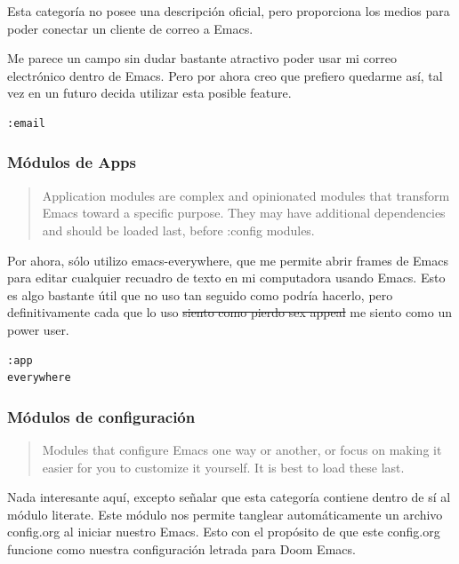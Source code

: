 \documentclass[11pt]{article}
\begin{document}
Esta categoría no posee una descripción oficial, pero proporciona los medios para poder conectar un cliente de correo a Emacs.

Me parece un campo sin dudar bastante atractivo poder usar mi correo electrónico dentro de Emacs. Pero por ahora creo que prefiero quedarme así, tal vez en un futuro decida utilizar esta posible feature.

\begin{verbatim}
:email

\end{verbatim}
\subsubsection{Módulos de Apps}
\label{sec:org59b2b0a}

\begin{quote}
Application modules are complex and opinionated modules that transform Emacs toward a specific purpose. They may have additional dependencies and should be loaded last, before :config modules.
\end{quote}

Por ahora, sólo utilizo emacs-everywhere, que me permite abrir frames de Emacs para editar cualquier recuadro de texto en mi computadora usando Emacs. Esto es algo bastante útil que no uso tan seguido como podría hacerlo, pero definitivamente cada que lo uso \sout{siento como pierdo sex appeal} me siento como un power user.

\begin{verbatim}
:app
everywhere

\end{verbatim}
\subsubsection{Módulos de configuración}
\label{sec:orgcc400b2}

\begin{quote}
Modules that configure Emacs one way or another, or focus on making it easier for you to customize it yourself. It is best to load these last.
\end{quote}

Nada interesante aquí, excepto señalar que esta categoría contiene dentro de sí al módulo literate. Este módulo nos permite tanglear automáticamente un archivo config.org al iniciar nuestro Emacs. Esto con el propósito de que este config.org funcione como nuestra configuración letrada para Doom Emacs.
\end{document}
